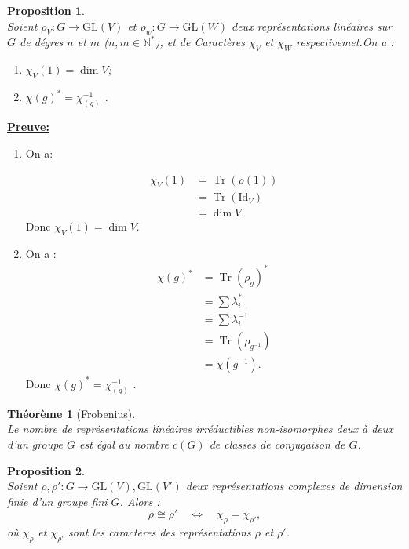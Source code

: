 \documentclass[a4paper, 14pt]{report}
\newtheorem{proposition}{Proposition}[section]
\newtheorem{theorem}{Théorème}[section]
\begin{document}
\begin{onehalfspace}
{\begin{proposition} \cite{serre1971representation} \\
Soient \( \rho_V : G \rightarrow \mathrm{GL}(V) \) et \( \rho_w : G \rightarrow \mathrm{GL}(W) \) deux représentations linéaires sur \(G\) de dégres \(n\) et \(m\) (\(n,m \in \mathbb{N^*}\)), et de Caractères \( \chi_V \) et \(\chi_W \)  respectivemet.On a :
	\begin{enumerate}[label=\roman*)]
		\item \( \chi_V(1) = \dim V \);
		\item \( \chi{(g)^*} = {\chi_{(g)}^{-1}} \) \quad {}. 
	\end{enumerate}
\end{proposition}


\textbf{\underline{Preuve:}} 
\begin{enumerate}[label=\roman*)]
	\item On a:
	
	\[
	\begin{aligned}
		\chi_V(1) &= \operatorname{Tr}(\rho(1)) \\
		&= \operatorname{Tr}(\mathrm{Id}_V) \\
		&= \dim V.
	\end{aligned}
	\]
	Donc \( \chi_V(1) = \dim V \).
	\item On a :
	\begin{align*}
		\chi(g)^* &= \operatorname{Tr}(\rho_g)^* \\
		&= \sum \lambda_i^* \\
		&= \sum \lambda_i^{-1} \\
		&= \operatorname{Tr}(\rho_{g^{-1}}) \\
		&= \chi(g^{-1}).
	\end{align*}
	Donc \( \chi{(g)^*} = {\chi_(g)^{-1}} \) \quad {}.	
\end{enumerate}


\begin{theorem}[Frobenius] \cite{serre1971representation} \\
Le nombre de représentations linéaires irréductibles non-isomorphes deux à deux d'un groupe \( G \) est égal au nombre \( c(G) \) de classes de conjugaison de \( G \).
\end{theorem}


\begin{proposition} \cite{renard2009groupes}\\
Soient \( \rho, \rho' : G \to \mathrm{GL}(V), \mathrm{GL}(V') \) deux représentations complexes de dimension finie d’un groupe fini \( G \). Alors :
\[
\rho \cong \rho' \quad \Leftrightarrow \quad \chi_\rho = \chi_{\rho'},
\]
où \( \chi_\rho \) et \( \chi_{\rho'} \) sont les caractères des représentations \( \rho \) et \( \rho' \).
\end{proposition}

}
\end{onehalfspace}
\end{document}
